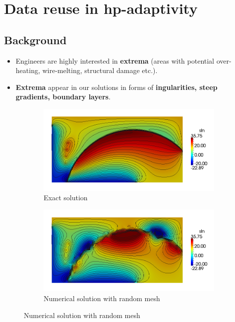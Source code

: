 \documentclass{beamer}
\title{}
\author[]{}
\date[]{}
\institute[]{}
\begin{document}
\newcommand{\bs}[1]{\LARGE \textit{\textbf{#1}}}


\section{Data reuse in hp-adaptivity}


\subsection{Background}


\begin{frame}

\begin{itemize}
\item Engineers are highly interested in \textbf{extrema} (areas with potential over-heating, wire-melting, structural damage etc.).
\item \vspace{-3mm} \textbf{Extrema} appear in our solutions in forms of \textbf{ingularities, steep gradients, boundary layers}.
\end{itemize}
\vspace{-1mm}
\begin{center}
	\begin{figure}[h!]
	\centering
	\begin{subfigure}{.45\textwidth}
		\centering
		\includegraphics[width=\textwidth]{80-sln.png}
		\vspace{-3mm}
		\caption{Exact solution}
	\end{subfigure}
	\begin{subfigure}{.45\textwidth}
		\centering
		\includegraphics[width=\textwidth]{0-sln.png}
		\vspace{-3mm}
		\caption{Numerical solution with random mesh}	
	\end{subfigure}
	\end{figure}
\end{center}


\end{frame}
\end{document}
